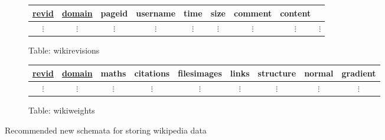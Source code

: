 \begin{figure}
  \centering
  \vspace{10 mm}
  \begin{subfigure}[b!]{\linewidth}
    \centering
    \begin{tabular}{ccccccccc}
      \toprule
      \underline{revid} & \underline{domain} & pageid & username & time & size &
      comment & content \\ 
      \midrule
      $\vdots$ & $\vdots$ & $\vdots$ & $\vdots$ & $\vdots$ & $\vdots$ & $\vdots$
      & $\vdots$ & $\vdots$ \\
    \end{tabular}
    \caption{Table: wikirevisions}
  \end{subfigure}

  \begin{subfigure}[b!]{\linewidth}
    \centering
    \begin{tabular}{ccccccccc}
      \toprule
      \underline{revid} & \underline{domain} & maths & citations & filesimages & links &
      structure & normal & gradient\\
      \midrule
      $\vdots$ & $\vdots$ & $\vdots$ & $\vdots$ & $\vdots$ & $\vdots$ &
      $\vdots$ & $\vdots$ & $\vdots$ \\
    \end{tabular}
    \caption{Table: wikiweights} 
  \end{subfigure}
  \caption{Recommended new schemata for storing wikipedia data}
  \label{fig:database-new}
\end{figure}

